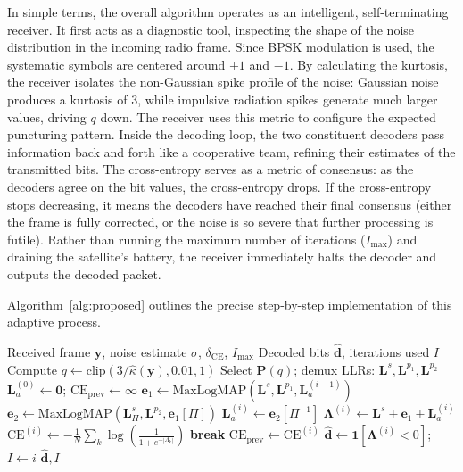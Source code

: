 \documentclass[journal,twocolumn]{IEEEtran}
\newcommand{\detabb}{\textsf{DET}}
\begin{document}
In simple terms, the overall algorithm operates as an intelligent, self-terminating receiver. It first acts as a diagnostic tool, inspecting the shape of the noise distribution in the incoming radio frame. Since BPSK modulation is used, the systematic symbols are centered around $+1$ and $-1$. By calculating the kurtosis, the receiver isolates the non-Gaussian spike profile of the noise: Gaussian noise produces a kurtosis of 3, while impulsive radiation spikes generate much larger values, driving $q$ down. The receiver uses this metric to configure the expected puncturing pattern. Inside the decoding loop, the two constituent decoders pass information back and forth like a cooperative team, refining their estimates of the transmitted bits. The cross-entropy serves as a metric of consensus: as the decoders agree on the bit values, the cross-entropy drops. If the cross-entropy stops decreasing, it means the decoders have reached their final consensus (either the frame is fully corrected, or the noise is so severe that further processing is futile). Rather than running the maximum number of iterations ($I_{\max}$) and draining the satellite's battery, the receiver immediately halts the decoder and outputs the decoded packet.

Algorithm~\ref{alg:proposed} outlines the precise step-by-step implementation of this adaptive process.

\begin{algorithm}[t]
\caption{Adaptive Turbo Decode with \detabb{}}
\label{alg:proposed}
\begin{algorithmic}[1]
\REQUIRE Received frame $\mathbf{y}$, noise estimate $\sigma$, $\delta_{\mathrm{CE}}$, $I_{\max}$
\ENSURE Decoded bits $\hat{\mathbf{d}}$, iterations used $I$
\STATE Compute $q \leftarrow \mathrm{clip}(3/\hat{\kappa}(\mathbf{y}), 0.01, 1)$
\STATE Select $\mathbf{P}(q)$; demux LLRs: $\mathbf{L}^s, \mathbf{L}^{p_1}, \mathbf{L}^{p_2}$
\STATE $\mathbf{L}_a^{(0)} \leftarrow \mathbf{0}$;\; $\mathrm{CE}_{\mathrm{prev}} \leftarrow \infty$
  \STATE $\mathbf{e}_1 \leftarrow \text{MaxLogMAP}(\mathbf{L}^s, \mathbf{L}^{p_1}, \mathbf{L}_a^{(i-1)})$
  \STATE $\mathbf{e}_2 \leftarrow \text{MaxLogMAP}(\mathbf{L}^s_\Pi, \mathbf{L}^{p_2}, \mathbf{e}_1[\Pi])$
  \STATE $\mathbf{L}_a^{(i)} \leftarrow \mathbf{e}_2[\Pi^{-1}]$
  \STATE $\boldsymbol{\Lambda}^{(i)} \leftarrow \mathbf{L}^s + \mathbf{e}_1 + \mathbf{L}_a^{(i)}$
  \STATE $\mathrm{CE}^{(i)} \leftarrow -\frac{1}{N}\sum_k \log\!\left(\frac{1}{1+e^{-|\Lambda_k|}}\right)$
    \STATE \textbf{break} 
  \ENDIF
  \STATE $\mathrm{CE}_{\mathrm{prev}} \leftarrow \mathrm{CE}^{(i)}$
\ENDFOR
\STATE $\hat{\mathbf{d}} \leftarrow \mathbf{1}[\boldsymbol{\Lambda}^{(i)} < 0]$;\; $I \leftarrow i$
\RETURN $\hat{\mathbf{d}}, I$
\end{algorithmic}
\end{algorithm}
\end{document}
